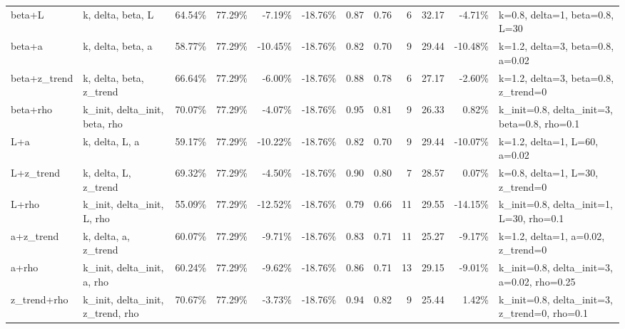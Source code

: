 \documentclass[10pt]{article}
\begin{document}
\begin{longtable}{p{0.9in}p{1.25in}rrrrrrrrrp{1.45in}}
beta+L & k, delta, beta, L & 64.54\% & 77.29\% & -7.19\% & -18.76\% & 0.87 & 0.76 & 6 & 32.17 & -4.71\% & k=0.8, delta=1, beta=0.8, L=30 \\
beta+a & k, delta, beta, a & 58.77\% & 77.29\% & -10.45\% & -18.76\% & 0.82 & 0.70 & 9 & 29.44 & -10.48\% & k=1.2, delta=3, beta=0.8, a=0.02 \\
beta+z\_trend & k, delta, beta, z\_trend & 66.64\% & 77.29\% & -6.00\% & -18.76\% & 0.88 & 0.78 & 6 & 27.17 & -2.60\% & k=1.2, delta=3, beta=0.8, z\_trend=0 \\
beta+rho & k\_init, delta\_init, beta, rho & 70.07\% & 77.29\% & -4.07\% & -18.76\% & 0.95 & 0.81 & 9 & 26.33 & 0.82\% & k\_init=0.8, delta\_init=3, beta=0.8, rho=0.1 \\
L+a & k, delta, L, a & 59.17\% & 77.29\% & -10.22\% & -18.76\% & 0.82 & 0.70 & 9 & 29.44 & -10.07\% & k=1.2, delta=1, L=60, a=0.02 \\
L+z\_trend & k, delta, L, z\_trend & 69.32\% & 77.29\% & -4.50\% & -18.76\% & 0.90 & 0.80 & 7 & 28.57 & 0.07\% & k=0.8, delta=1, L=30, z\_trend=0 \\
L+rho & k\_init, delta\_init, L, rho & 55.09\% & 77.29\% & -12.52\% & -18.76\% & 0.79 & 0.66 & 11 & 29.55 & -14.15\% & k\_init=0.8, delta\_init=1, L=30, rho=0.1 \\
a+z\_trend & k, delta, a, z\_trend & 60.07\% & 77.29\% & -9.71\% & -18.76\% & 0.83 & 0.71 & 11 & 25.27 & -9.17\% & k=1.2, delta=1, a=0.02, z\_trend=0 \\
a+rho & k\_init, delta\_init, a, rho & 60.24\% & 77.29\% & -9.62\% & -18.76\% & 0.86 & 0.71 & 13 & 29.15 & -9.01\% & k\_init=0.8, delta\_init=3, a=0.02, rho=0.25 \\
z\_trend+rho & k\_init, delta\_init, z\_trend, rho & 70.67\% & 77.29\% & -3.73\% & -18.76\% & 0.94 & 0.82 & 9 & 25.44 & 1.42\% & k\_init=0.8, delta\_init=3, z\_trend=0, rho=0.1 \\
\bottomrule
\end{longtable}
\normalsize
\end{document}
